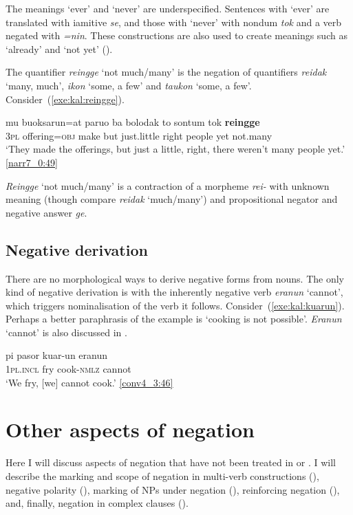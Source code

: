 \documentclass[output=paper,colorlinks,citecolor=brown,draft]{langscibook}
\begin{document}
The meanings `ever' and `never' are underspecified. Sentences with `ever' are translated with iamitive \textit{se}, and those with `never' with nondum \textit{tok} and a verb negated with \textit{=nin}. These constructions are also used to create meanings such as `already' and `not yet' ().

The quantifier \textit{reingge} `not much/many' is the negation of quantifiers \textit{reidak} `many, much', \textit{ikon} `some, a few' and \textit{taukon} `some, a few'. Consider~(\ref{exe:kal:reingge}).

\ea 	\label{exe:kal:reingge}
\gll mu buoksarun=at paruo ba bolodak to sontum tok \textbf{reingge}\\
\textsc{3pl} offering=\textsc{obj} make but just.little right people yet not.many\\
\glt	`They made the offerings, but just a little, right, there weren't many people yet.' {\href{http://hdl.handle.net/10050/00-0000-0000-0004-1BB3-0}{[narr7\_0:49]}}
\z 

\textit{Reingge} `not much/many' is a contraction of a morpheme \textit{rei-} with unknown meaning (though compare \textit{reidak} `much/many') and propositional negator and negative answer \textit{ge}. 

\subsection{Negative derivation}
\label{sec:negder}
There are no morphological ways to derive negative forms from nouns. The only kind of negative derivation is with the inherently negative verb \textit{eranun} `cannot', which triggers nominalisation of the verb it follows. Consider~(\ref{exe:kal:kuarun}). Perhaps a better paraphrasis of the example is `cooking is not possible'. \textit{Eranun} `cannot' is also discussed in .

\ea \label{exe:kal:kuarun}
\gll pi pasor kuar-un eranun\\
\textsc{1pl.incl} fry cook-\textsc{nmlz} cannot\\
\glt `We fry, [we] cannot cook.' {\href{http://hdl.handle.net/10050/00-0000-0000-0004-1BCE-D}{[conv4\_3:46]}}
\z 




\section{Other aspects of negation} 
\label{sec:othneg}
Here I will discuss aspects of negation that have not been treated in  or . I will describe the marking and scope of negation in multi-verb constructions (), negative polarity (), marking of NPs under negation (), reinforcing negation (), and, finally, negation in complex clauses ().
\end{document}
